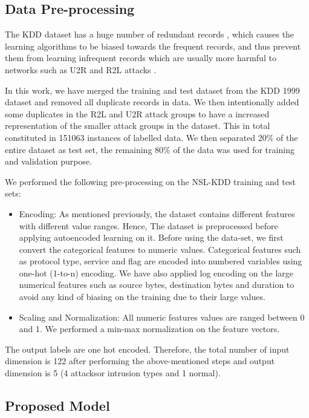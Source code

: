 \documentclass[runningheads]{llncs}
\begin{document}
\subsection{Data Pre-processing}
The KDD dataset \cite{kdd1999} has a huge number of redundant records , which causes the learning algorithms to be biased towards the frequent records, and thus prevent them from learning infrequent records which are usually more harmful to networks such as U2R and R2L attacks \cite{tavallaee2009}. 

In this work, we have merged the training and test dataset from the KDD 1999 dataset and removed all duplicate records in data. We then intentionally added some duplicates in the R2L and U2R attack groups to have a increased representation of the smaller attack groups in the dataset. This in total constituted in 151063 instances of labelled data. We then separated 20\% of the entire dataset as test set, the remaining 80\% of the data was used for training and validation purpose. 

We performed the following pre-processing on the NSL-KDD training and test sets:

\begin{itemize}
\item{Encoding:}
As mentioned previously, the dataset contains different features with different value ranges. Hence, The dataset is preprocessed
before applying autoencoded learning on it. Before using the data-set, we first convert the categorical features to numeric values. Categorical features such as protocol type, service and flag are encoded into numbered variables using one-hot (1-to-n) encoding. We have also applied log encoding on the large numerical features such as source bytes, destination bytes and duration to avoid any kind of biasing on the training due to their large values.

\item{ Scaling and Normalization:}
All numeric features values are ranged between 0 and 1. We performed a min-max normalization on the feature vectors. 
   \end{itemize}
The output labels are one hot encoded. Therefore, the total number of input dimension is 122 after performing the above-mentioned steps and output dimension is 5 (4 attacksor intrusion types and 1 normal).  



\subsection{Proposed Model}
 
\end{document}
